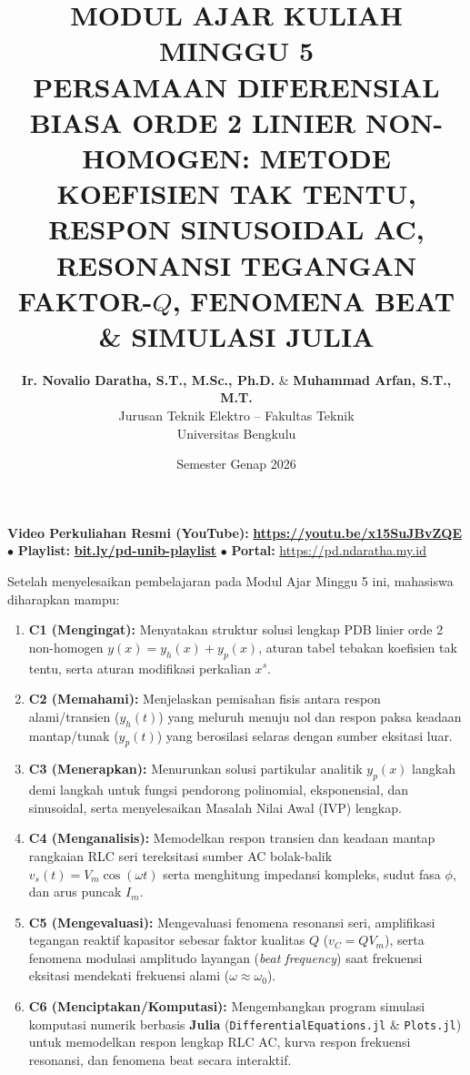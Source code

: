 \documentclass[11pt,a4paper]{article}
\title{\textbf{\Large MODUL AJAR KULIAH MINGGU 5}\\[0.3cm]
\textbf{\LARGE PERSAMAAN DIFERENSIAL BIASA ORDE 2 LINIER NON-HOMOGEN: METODE KOEFISIEN TAK TENTU, RESPON SINUSOIDAL AC, RESONANSI TEGANGAN FAKTOR-$Q$, FENOMENA BEAT \& SIMULASI JULIA}}
\author{\textbf{Ir. Novalio Daratha, S.T., M.Sc., Ph.D.} \& \textbf{Muhammad Arfan, S.T., M.T.} \\ 
Jurusan Teknik Elektro -- Fakultas Teknik \\ 
Universitas Bengkulu}
\date{Semester Genap 2026}
\theoremstyle{definition}
\begin{document}
\maketitle
\begin{center}
  \vspace{-0.25cm}
  \begin{tcolorbox}[colback=red!4!white,colframe=red!75!black,boxrule=0.5pt,arc=2pt,left=6pt,right=6pt,top=3pt,bottom=3pt,width=0.98\textwidth]
    \centering\footnotesize
    \textbf{Video Perkuliahan Resmi (YouTube):} {\color{red!80!black}\textbf{\url{https://youtu.be/x15SuJBvZQE}}} \quad $\bullet$ \quad \textbf{Playlist:} \href{https://www.youtube.com/playlist?list=PLS5oOZWXZeTw}{\color{blue!80!black}\textbf{bit.ly/pd-unib-playlist}} \quad $\bullet$ \quad \textbf{Portal:} \url{https://pd.ndaratha.my.id}
  \end{tcolorbox}
  \vspace{-0.15cm}
\end{center}


\begin{tcolorbox}[colback=blue!5!white,colframe=headercolor,title=\textbf{Capaian Pembelajaran Khusus (Sub-CPMK 3)}]
Setelah menyelesaikan pembelajaran pada Modul Ajar Minggu 5 ini, mahasiswa diharapkan mampu:
\begin{enumerate}[leftmargin=*]
    \item \textbf{C1 (Mengingat):} Menyatakan struktur solusi lengkap PDB linier orde 2 non-homogen $y(x) = y_h(x) + y_p(x)$, aturan tabel tebakan koefisien tak tentu, serta aturan modifikasi perkalian $x^s$.
    \item \textbf{C2 (Memahami):} Menjelaskan pemisahan fisis antara respon alami/transien ($y_h(t)$) yang meluruh menuju nol dan respon paksa keadaan mantap/tunak ($y_p(t)$) yang berosilasi selaras dengan sumber eksitasi luar.
    \item \textbf{C3 (Menerapkan):} Menurunkan solusi partikular analitik $y_p(x)$ langkah demi langkah untuk fungsi pendorong polinomial, eksponensial, dan sinusoidal, serta menyelesaikan Masalah Nilai Awal (IVP) lengkap.
    \item \textbf{C4 (Menganalisis):} Memodelkan respon transien dan keadaan mantap rangkaian RLC seri tereksitasi sumber AC bolak-balik $v_s(t) = V_m \cos(\omega t)$ serta menghitung impedansi kompleks, sudut fasa $\phi$, dan arus puncak $I_m$.
    \item \textbf{C5 (Mengevaluasi):} Mengevaluasi fenomena resonansi seri, amplifikasi tegangan reaktif kapasitor sebesar faktor kualitas $Q$ ($v_C = Q V_m$), serta fenomena modulasi amplitudo layangan (\textit{beat frequency}) saat frekuensi eksitasi mendekati frekuensi alami ($\omega \approx \omega_0$).
    \item \textbf{C6 (Menciptakan/Komputasi):} Mengembangkan program simulasi komputasi numerik berbasis \textbf{Julia} (\texttt{DifferentialEquations.jl} \& \texttt{Plots.jl}) untuk memodelkan respon lengkap RLC AC, kurva respon frekuensi resonansi, dan fenomena beat secara interaktif.
\end{enumerate}
\end{tcolorbox}
\end{document}
